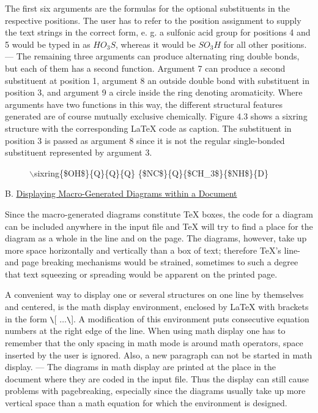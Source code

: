  The first six arguments are the formulas for the optional 
 substituents in the respective positions. The user has to
 refer to the position assignment to supply the text strings
 in the correct form, e. g. a sulfonic acid group for positions
 4 and 5 would be typed in as $HO_{3}S$, whereas it would be
 $SO_{3}H$ for all other positions. --- The remaining three
 arguments can produce alternating ring double bonds, but each
 of them has a second function. Argument 7 can produce a second
 substituent at position 1, argument 8 an outside double bond
 with substituent in position 3, and argument 9 a circle inside
 the ring denoting aromaticity. Where arguments have two 
 functions in this way, the different structural features
 generated are of course mutually exclusive chemically.
 Figure 4.3 shows a sixring structure with the corresponding
 LaTeX code as caption. The substituent in position 3 is passed
 as argument 8 since it is not the regular single-bonded
 substituent represented by argument 3.

 \begin{figure}[h]\centering   
  \caption{$\backslash $sixring\{\$OH\$\}\{Q\}\{Q\}\{Q\}
     \{\$NC\$\}\{Q\}\{\$CH\_3\$\}\{\$NH\$\}\{D\}   }
 \end{figure}
  
 \vspace{0.4cm}
 \noindent B. \underline{Displaying Macro-Generated Diagrams
    within a Document}

 Since the macro-generated diagrams constitute TeX boxes, the          
 code for a diagram can be included anywhere in the input file
 and TeX will try to find a place for the diagram as a whole
 in the line and on the page. The diagrams, however, take up
 more space horizontally and vertically than a box of text;
 therefore TeX's line- and page breaking mechanisms would be
 strained, sometimes to such a degree that text squeezing or
 spreading would be apparent on the printed page.

 A convenient way to display one or several structures on one
 line by themselves and centered, is the math display environment,
 enclosed by LaTeX with brackets in the form \verb+\+[
 $\ldots $\verb+\+].  A modification of this environment puts
 consecutive equation numbers at the right edge of the line.
 When using math display one has to remember that the only
 spacing in math mode is around math operators, space inserted
 by the user is ignored. Also, a new    
 paragraph can not be started in math display. ---
 The diagrams in math display are printed at the place in
 the document where they are coded in the input file.
 Thus the display can still cause problems with pagebreaking,
 especially since the diagrams usually take up more vertical
 space than a math equation for which the environment is
 designed.

